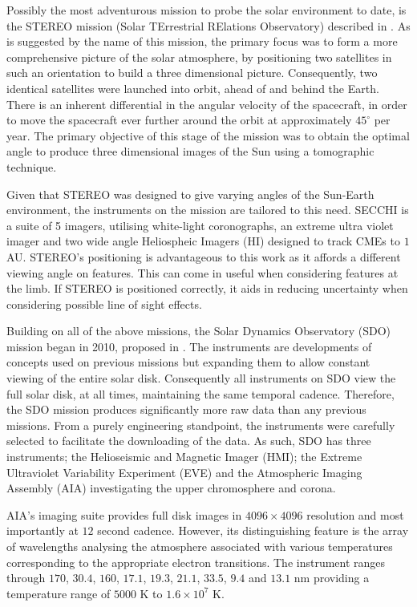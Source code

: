 Possibly the most adventurous mission to probe the solar environment to date, is the STEREO mission (Solar TErrestrial RElations Observatory) described in \cite{Kaiser2008}.
As is suggested by the name of this mission, the primary focus was to form a more comprehensive picture of the solar atmosphere, by positioning two satellites in such an orientation to build a three dimensional picture.
Consequently, two identical satellites were launched into orbit, ahead of and behind the Earth.
There is an inherent differential in the angular velocity of the spacecraft, in order to move the spacecraft ever further around the orbit at approximately $45^\circ$ per year.
The primary objective of this stage of the mission was to obtain the optimal angle to produce three dimensional images of the Sun using a tomographic technique.

Given that STEREO was designed to give varying angles of the Sun-Earth  environment, the instruments on the mission are tailored to this need.
SECCHI is a suite of 5 imagers, utilising white-light coronographs, an extreme ultra violet imager and two wide angle Heliospheic Imagers (HI) designed to track CMEs to $1$ AU.
STEREO's positioning is advantageous to this work as it affords a different viewing angle on features.
This can come in useful when considering features at the limb.
If STEREO is positioned correctly, it aids in reducing uncertainty when considering possible line of sight effects.

Building on all of the above missions, the Solar Dynamics Observatory (SDO) mission began in 2010, proposed in \cite{Pesnell2012}.
The instruments are developments of concepts used on previous missions but expanding them to allow constant viewing of the entire solar disk.
Consequently all instruments on SDO view the full solar disk, at all times, maintaining the same temporal cadence. 
Therefore, the SDO mission produces significantly more raw data than any previous missions.
From a purely engineering standpoint, the instruments were carefully selected to facilitate the downloading of the data.
As such, SDO has three instruments; the Helioseismic and Magnetic Imager (HMI); the Extreme Ultraviolet Variability Experiment (EVE) and the Atmospheric Imaging Assembly (AIA) investigating the upper chromosphere and corona.

AIA's imaging suite provides full disk images in $4096 \times 4096$ resolution and most importantly at $12$ second cadence.
However, its distinguishing feature is the array of wavelengths analysing the atmosphere \cite{AIAspec} associated with various temperatures corresponding to the appropriate electron transitions.
The instrument ranges through $170$, $30.4$, $160$, $17.1$, $19.3$, $21.1$, $33.5$, $9.4$ and $13.1$ nm providing a temperature range of $5000$ K to $1.6 \times 10^7$ K.

